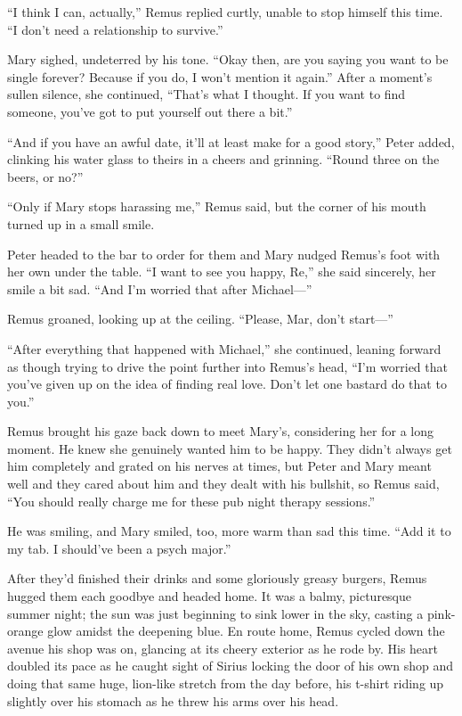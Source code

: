 “I think I can, actually,” Remus replied curtly, unable to stop himself this time. “I don’t need a relationship to survive.”

Mary sighed, undeterred by his tone. “Okay then, are you saying you want to be single forever? Because if you do, I won’t mention it again.” After a moment’s sullen silence, she continued, “That’s what I thought. If you want to find someone, you’ve got to put yourself out there a bit.”

“And if you have an awful date, it’ll at least make for a good story,” Peter added, clinking his water glass to theirs in a cheers and grinning. “Round three on the beers, or no?”

“Only if Mary stops harassing me,” Remus said, but the corner of his mouth turned up in a small smile.

Peter headed to the bar to order for them and Mary nudged Remus’s foot with her own under the table. “I want to see you happy, Re,” she said sincerely, her smile a bit sad. “And I’m worried that after Michael—”

Remus groaned, looking up at the ceiling. “Please, Mar, don’t start—”

“After everything that happened with Michael,” she continued, leaning forward as though trying to drive the point further into Remus’s head, “I’m worried that you’ve given up on the idea of finding real love. Don’t let one bastard do that to you.”

Remus brought his gaze back down to meet Mary’s, considering her for a long moment. He knew she genuinely wanted him to be happy. They didn’t always get him completely and grated on his nerves at times, but Peter and Mary meant well and they cared about him and they dealt with his bullshit, so Remus said, “You should really charge me for these pub night therapy sessions.”

He was smiling, and Mary smiled, too, more warm than sad this time. “Add it to my tab. I should’ve been a psych major.”

After they’d finished their drinks and some gloriously greasy burgers, Remus hugged them each goodbye and headed home. It was a balmy, picturesque summer night; the sun was just beginning to sink lower in the sky, casting a pink-orange glow amidst the deepening blue. En route home, Remus cycled down the avenue his shop was on, glancing at its cheery exterior as he rode by. His heart doubled its pace as he caught sight of Sirius locking the door of his own shop and doing that same huge, lion-like stretch from the day before, his t-shirt riding up slightly over his stomach as he threw his arms over his head.

